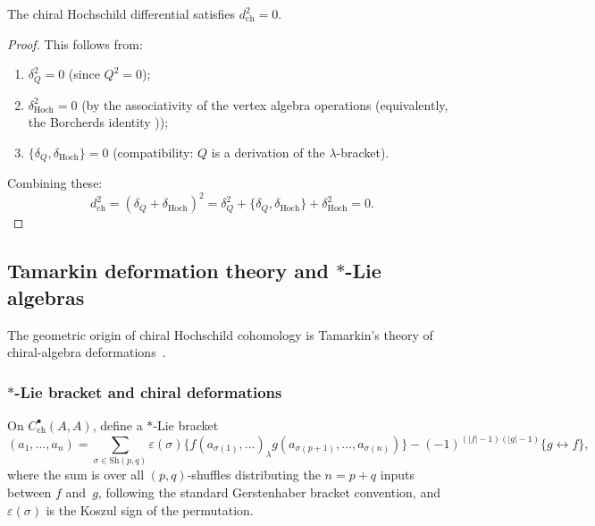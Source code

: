 \begin{lemma}[$d_{\text{ch}}^2 = 0$; \ClaimStatusProvedHere]
\label{lem:dch_squared}
The chiral Hochschild differential satisfies $d_{\text{ch}}^2 = 0$.
\end{lemma}
\begin{proof}
This follows from:
\begin{enumerate}[label=(\roman*)]
\item $\delta_Q^2 = 0$ (since $Q^2 = 0$);
\item $\delta_{\text{Hoch}}^2 = 0$ (by the associativity of the vertex algebra operations (equivalently, the Borcherds identity \cite{Kac98}));
\item $\{\delta_Q, \delta_{\text{Hoch}}\} = 0$ (compatibility: $Q$ is a derivation of the $\lambda$-bracket).
\end{enumerate}
Combining these:
\begin{equation}
d_{\text{ch}}^2 = (\delta_Q + \delta_{\text{Hoch}})^2 = \delta_Q^2 + \{\delta_Q, \delta_{\text{Hoch}}\} + \delta_{\text{Hoch}}^2 = 0.
\end{equation}
\end{proof}

\subsection{\texorpdfstring{Tamarkin deformation theory and $*$-Lie algebras}{Tamarkin deformation theory and star-Lie algebras}}

The geometric origin of chiral Hochschild cohomology is Tamarkin's theory of chiral-algebra deformations~\cite{Tam02}.

\subsubsection{\texorpdfstring{$*$-Lie bracket and chiral deformations}{Star-Lie bracket and chiral deformations}}
\begin{definition}
\label{def:star_lie}
On $C^\bullet_{\text{ch}}(A, A)$, define a $*$-Lie bracket
\begin{equation}
[f *_\lambda g](a_1, \ldots, a_n) = \sum_{\sigma \in \mathrm{Sh}(p,q)} \varepsilon(\sigma) \{f(a_{\sigma(1)}, \ldots)_\lambda g(a_{\sigma(p+1)}, \ldots, a_{\sigma(n)})\} - (-1)^{(|f|-1)(|g|-1)} \{g \leftrightarrow f\},
\end{equation}
where the sum is over all $(p,q)$-shuffles distributing the $n = p+q$ inputs between $f$ and~$g$, following the standard Gerstenhaber bracket convention, and $\varepsilon(\sigma)$ is the Koszul sign of the permutation.
\end{definition}

